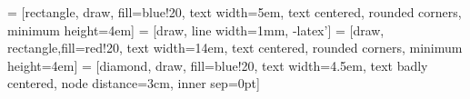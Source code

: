 \documentclass{article}
\begin{document}
\pagestyle{empty}
\renewcommand{\arraystretch}{0.75}




 = [rectangle, draw, fill=blue!20, 
    text width=5em, text centered, rounded corners, minimum height=4em]
 = [draw, line width=1mm, -latex']
 = [draw, rectangle,fill=red!20, 
       text width=14em, text centered, rounded corners, minimum height=4em]
 = [diamond, draw, fill=blue!20, 
    text width=4.5em, text badly centered, node distance=3cm, inner sep=0pt]
    
\end{document}
